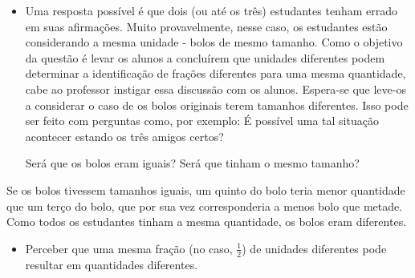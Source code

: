 \begin{orientacoes}

  \begin{itemize} %
  \item Uma resposta possível é que dois (ou até os três) estudantes tenham errado em suas afirmações.    Muito provavelmente, nesse caso, os estudantes estão considerando a mesma unidade - bolos de mesmo tamanho. 
Como o objetivo da questão é levar os alunos a concluírem que unidades diferentes podem determinar a identificação de frações diferentes para uma mesma quantidade, cabe ao professor instigar essa discussão com os alunos. Espera-se que leve-os a considerar o caso de os bolos originais terem tamanhos diferentes. Isso pode ser feito com perguntas como, por exemplo: É possível uma tal situação acontecer estando os três amigos certos?

Será que os bolos eram iguais? Será que tinham o mesmo tamanho? 
\end{itemize}
\end{orientacoes}

\begin{solucao}{}{}
  Se os bolos tivessem tamanhos iguais, um quinto do bolo teria menor quantidade que um terço do bolo, que por sua vez corresponderia a menos bolo que metade. Como todos os estudantes tinham a mesma quantidade, os bolos eram diferentes.

  \end{solucao}


\begin{objetivos}{}{}
  \begin{itemize} %
    \item       Perceber que uma mesma fração (no caso, $\frac{1}{2}$) de unidades diferentes pode resultar em quantidades diferentes.
\end{itemize} %
\end{objetivos}

